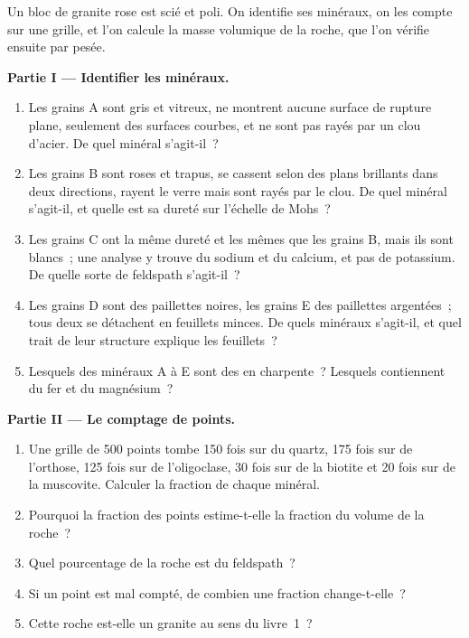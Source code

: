 \begin{problem}
\label{pb:g11:minerals:1}
Un bloc de granite rose est scié et poli. On identifie ses minéraux, on les
compte sur une grille, et l'on calcule la masse volumique de la roche, que
l'on vérifie ensuite par pesée.

\medskip
\noindent\textbf{Partie I --- Identifier les minéraux.}
\begin{enumerate}
  \item Les grains A sont gris et vitreux, ne montrent aucune surface de
        rupture plane, seulement des surfaces courbes, et ne sont pas rayés
        par un clou d'acier. De quel minéral s'agit-il~?
  \item Les grains B sont roses et trapus, se cassent selon des plans
        brillants dans deux directions, rayent le verre mais sont rayés par
        le clou. De quel minéral s'agit-il, et quelle est sa dureté sur
        l'échelle de Mohs~?
  \item Les grains C ont la même dureté et les mêmes  que les
        grains B, mais ils sont blancs~; une analyse y trouve du sodium et
        du calcium, et pas de potassium. De quelle sorte de feldspath
        s'agit-il~?
  \item Les grains D sont des paillettes noires, les grains E des
        paillettes argentées~; tous deux se détachent en feuillets minces.
        De quels minéraux s'agit-il, et quel trait de leur structure
        explique les feuillets~?
  \item Lesquels des minéraux A à E sont des  en charpente~?
        Lesquels contiennent du fer et du magnésium~?
\end{enumerate}

\medskip
\noindent\textbf{Partie II --- Le comptage de points.}
\begin{enumerate}[resume]
  \item Une grille de 500 points tombe 150 fois sur du quartz, 175 fois sur
        de l'orthose, 125 fois sur de l'oligoclase, 30 fois sur de la
        biotite et 20 fois sur de la muscovite. Calculer la fraction de
        chaque minéral.
  \item Pourquoi la fraction des points estime-t-elle la fraction du volume
        de la roche~?
  \item Quel pourcentage de la roche est du feldspath~?
  \item Si un point est mal compté, de combien une fraction change-t-elle~?
  \item Cette roche est-elle un granite au sens du livre~1~?
\end{enumerate}


\end{problem}
